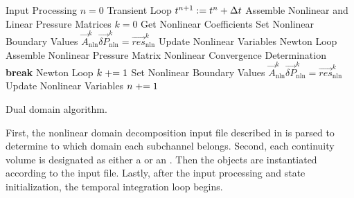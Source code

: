 \begin{algo}[ht!]
\setlength{\baselineskip}{0.625\baselineskip}
\begin{algorithmic}[1]
\Require Input Processing
\Set $n = 0$
\Loop \; Transient Loop
    \Set $t^{n+1} : = t^{n} + \dt{}$
	\Algorithm Assemble Nonlinear and Linear Pressure Matrices	 
	    \Set $k = 0$
		\Algorithm Get Nonlinear Coefficients 
		\Algorithm Set Nonlinear Boundary Values 
		\Solve $\vec{A}^{k}_{\text{nln}} \vec{\delta P}_{\text{nln}}^{k} = \vec{res}_{\text{nln}}^{k}$	
		\Algorithm Update Nonlinear Variables  
	    \Loop \; Newton Loop
			\Algorithm Assemble Nonlinear Pressure Matrix 
			\Algorithm Nonlinear Convergence Determination 
				\State \textbf{break} Newton Loop 
			\EndIf		
			\Set $k \mathrel{+}= 1$
			\Algorithm Set Nonlinear Boundary Values 
			\Solve $\vec{A}_{\text{nln}}^{k} \vec{\delta P}_{\text{nln}}^{k} = \vec{res}_{\text{nln}}^{k}$
			\Algorithm Update Nonlinear Variables 
		\EndLoop
	\EndIf
	 
	\Set $n \mathrel{+}= 1$
\EndLoop
\end{algorithmic}
\caption{Dual domain \cobra{} algorithm.}
\label{alg:domDecompAlgorithm}
\end{algo}

First, the nonlinear domain decomposition input file described in  is parsed to determine to which domain each subchannel belongs.
Second, each continuity volume is designated as either a  or an .
Then the  objects are instantiated according to the \cobra{} input file.
Lastly, after the input processing and state initialization, the temporal integration loop begins.

